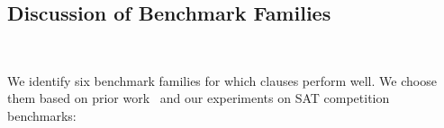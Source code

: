 





\subsection{Discussion of Benchmark Families}~\label{subsec:eval-discussion}

We identify six benchmark families for which \pr clauses perform well. We choose
them based on prior work~\cite{prelearn} and our experiments on SAT competition
benchmarks:

